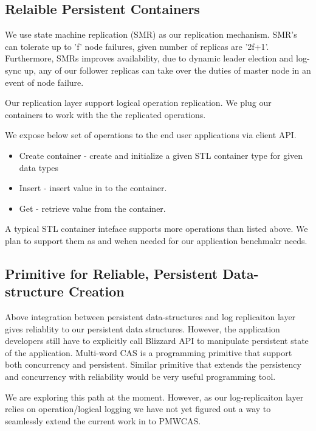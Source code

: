 \subsection{Relaible Persistent Containers}

We use state machine replication (SMR) as our replication mechanism. SMR's can tolerate
up to 'f' node failures, given number of replicas are '2f+1'. Furthermore, SMRs improves
availability, due to dynamic leader election and log-sync up, any of our follower replicas
can take over the duties of master node in an event of node failure.

Our replication layer support logical operation replication. We plug our containers to work with
the the replicated operations. 

We expose below set of operations to the end user applications via client API.

\begin{itemize}
\item Create container - create and initialize a given STL container type for given data types
\item Insert - insert value in to the container.
\item Get - retrieve value from the container.
\end{itemize}

A typical STL container inteface supports more operations than listed above. We plan to support them
as and wehen needed for our application benchmakr needs.

\subsection{Primitive for Reliable, Persistent Data-structure Creation}

Above integration between persistent data-structures and log replicaiton layer
gives reliablity to our persistent data structures. However, the application developers 
still have to explicitly call Blizzard API to manipulate persistent state of the application.
Multi-word CAS is a programming primitive that support both concurrency and persistent. Similar
primitive that extends the persistency and concurrency with reliability would be very useful
programming tool.

We are exploring this path at the moment. However, as our log-replicaiton layer relies on operation/logical
logging we have not yet figured out a way to seamlessly extend the current work in to PMWCAS.




